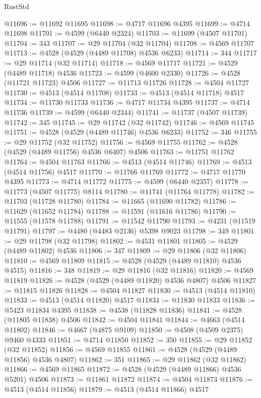 \begin{lexlean}{RustStd}
\begin{coremodule}
@11696 := @11692 @11695
@11698 := @4717 @11696 @4395
@11699 := @4714 @11698
@11701 := @4599 (@6440 @2324)
@11703 := @11699 (@4507 @11701)
@11704 := 343
@11707 := @29 @11704 (@32 @11704)
@11708 := @4569 @11707
@11713 := @4528 (@4529 (@4489 @11708) @4536 @6233)
@11714 := 344
@11717 := @29 @11714 (@32 @11714)
@11718 := @4569 @11717
@11721 := @4529 (@4489 @11718) @4536
@11723 := @4599 (@4600 @2330)
@11726 := @4528 (@11721 @11723) @4506
@11727 := @11713 @11726
@11728 := @4504 @11727
@11730 := @4513 (@4514 @11708)
@11733 := @4513 (@4514 @11718) @4517
@11734 := @11730 @11733
@11736 := @4717 @11734 @4395
@11737 := @4714 @11736
@11739 := @4599 (@6440 @2344)
@11741 := @11737 (@4507 @11739)
@11742 := 345
@11745 := @29 @11742 (@32 @11742)
@11746 := @4569 @11745
@11751 := @4528 (@4529 (@4489 @11746) @4536 @6233)
@11752 := 346
@11755 := @29 @11752 (@32 @11752)
@11756 := @4569 @11755
@11762 := @4528 (@4529 (@4489 @11756) @4536 @6407) @4506
@11763 := @11751 @11762
@11764 := @4504 @11763
@11766 := @4513 (@4514 @11746)
@11769 := @4513 (@4514 @11756) @4517
@11770 := @11766 @11769
@11772 := @4717 @11770 @4395
@11773 := @4714 @11772
@11775 := @4599 (@6440 @2357)
@11778 := @11773 (@4507 @11775) @8114
@11780 := @11741 (@11764 @11778)
@11782 := @11703 (@11728 @11780)
@11784 := @11665 (@11690 @11782)
@11786 := @11629 (@11652 @11784)
@11788 := @11591 (@11616 @11786)
@11790 := @11555 (@11578 @11788)
@11791 := @11542 @11790
@11793 := @4231 (@11519 @11791)
@11797 := @4480 (@4483 @2136) @5398 @9023
@11798 := 349
@11801 := @29 @11798 (@32 @11798)
@11802 := @4531 @11801
@11805 := @4529 (@4489 @11802) @4536
@11806 := 347
@11809 := @29 @11806 (@32 @11806)
@11810 := @4569 @11809
@11815 := @4528 (@4529 (@4489 @11810) @4536 @4515)
@11816 := 348
@11819 := @29 @11816 (@32 @11816)
@11820 := @4569 @11819
@11826 := @4528 (@4529 (@4489 @11820) @4536 @4807) @4506
@11827 := @11815 @11826
@11828 := @4504 @11827
@11830 := @4513 (@4514 @11810)
@11833 := @4513 (@4514 @11820) @4517
@11834 := @11830 @11833
@11836 := @5423 @11834 @4395
@11838 := @4538 (@11828 @11836)
@11841 := @4528 (@11805 @11838) @4506
@11842 := @4504 @11841
@11844 := @4663 (@4514 @11802)
@11846 := @4667 (@4875 @9109)
@11850 := @4508 (@4509 @2375) @9460 @4333
@11851 := @4714 @11850
@11852 := 350
@11855 := @29 @11852 (@32 @11852)
@11856 := @4569 @11855
@11861 := @4528 (@4529 (@4489 @11856) @4536 @4807)
@11862 := 351
@11865 := @29 @11862 (@32 @11862)
@11866 := @4569 @11865
@11872 := @4528 (@4529 (@4489 @11866) @4536 @5201) @4506
@11873 := @11861 @11872
@11874 := @4504 @11873
@11876 := @4513 (@4514 @11856)
@11879 := @4513 (@4514 @11866) @4517

\end{coremodule}
\end{lexlean}
